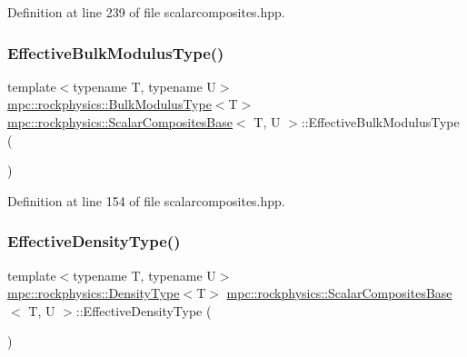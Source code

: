 Definition at line 239 of file scalarcomposites.\+hpp.

\mbox{\label{classmpc_1_1rockphysics_1_1_scalar_composites_base_abf9cbdafe0b2db8ef6022c5ea6ea74f1}} 
\subsubsection{\texorpdfstring{Effective\+Bulk\+Modulus\+Type()}{EffectiveBulkModulusType()}}
{\footnotesize\ttfamily template$<$typename T, typename U$>$ \\
\mbox{\hyperlink{structmpc_1_1rockphysics_1_1_bulk_modulus_type}{mpc\+::rockphysics\+::\+Bulk\+Modulus\+Type}}$<$T$>$ \mbox{\hyperlink{classmpc_1_1rockphysics_1_1_scalar_composites_base}{mpc\+::rockphysics\+::\+Scalar\+Composites\+Base}}$<$ T, U $>$\+::Effective\+Bulk\+Modulus\+Type (\begin{DoxyParamCaption}{ }\end{DoxyParamCaption})\hspace{0.3cm}{\ttfamily [inline]}}



Definition at line 154 of file scalarcomposites.\+hpp.

\mbox{\label{classmpc_1_1rockphysics_1_1_scalar_composites_base_aa9757cc729294537fe5045a1e26e0b35}} 
\subsubsection{\texorpdfstring{Effective\+Density\+Type()}{EffectiveDensityType()}}
{\footnotesize\ttfamily template$<$typename T, typename U$>$ \\
\mbox{\hyperlink{structmpc_1_1rockphysics_1_1_density_type}{mpc\+::rockphysics\+::\+Density\+Type}}$<$T$>$ \mbox{\hyperlink{classmpc_1_1rockphysics_1_1_scalar_composites_base}{mpc\+::rockphysics\+::\+Scalar\+Composites\+Base}}$<$ T, U $>$\+::Effective\+Density\+Type (\begin{DoxyParamCaption}{ }\end{DoxyParamCaption})\hspace{0.3cm}{\ttfamily [inline]}}



